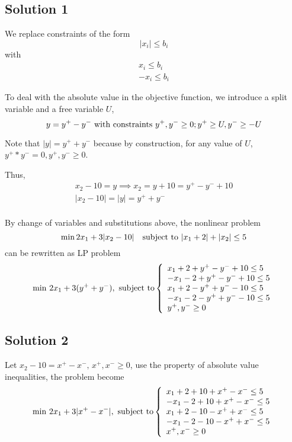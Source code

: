 \documentclass{article}
\begin{document}
\subsection{Solution 1}
We replace constraints of the form
\begin{equation} |x_i| \leq b_i \end{equation}
with
\begin{equation}
\begin{split}
	x_i \leq b_i \\
	-x_i \leq b_i
\end{split}
\end{equation}

To deal with the absolute value in the objective function, we introduce a split variable
and a free variable $U$,
\[ y = y^+ - y^- \textnormal{~with constraints~} y^+, y^- \geq 0; y^+ \geq U, y^- \geq -U \]

Note that $|y| = y^+ + y^-$ because by construction, for any value of $U$, $y^+ * y^- = 0,   y^+, y^- \geq 0$.

Thus,
\begin{gather}
x_2 - 10 = y \implies x_2 = y + 10 = y^+ - y^- + 10 \\
|x_2 - 10| = |y| = y^+ + y^- \\
\end{gather}

By change of variables and substitutions above, the nonlinear problem
\[ \min 2 x_1 + 3|x_2 - 10| \quad \textnormal{subject to~} |x_1 + 2| + |x_2| \leq 5 \]
can be rewritten as LP problem
\begin{equation}
\min \, 2x_1+3(y^+ + y^-), \textnormal{ subject to}
\left\{
    \begin{array}{l}
    x_1 + 2 + y^+ - y^- + 10 \leq 5 \\
    -x_1 - 2 + y^+ - y^- + 10 \leq 5 \\
    x_1 + 2 - y^+ + y^- - 10 \leq 5 \\
    -x_1 - 2 - y^+ + y^- - 10 \leq 5 \\
     y^+, y^- \geq 0
    \end{array}
\right.
\end{equation}

\subsection{Solution 2}
Let $x_2-10=x^+-x^-,\, x^+,x^-\geq 0$, use the property of absolute value inequalities, the problem become
\begin{equation}  
\min \, 2x_1+3|x^+-x^-|, \textnormal{ subject to}
\left\{  
             \begin{array}{ll}
             x_1+2+10+x^+-x^-\leq 5\\
             -x_1-2+10+x^+-x^-\leq 5\\
             x_1+2-10-x^++x^-\leq 5\\
             -x_1-2-10-x^++x^-\leq 5\\
             x^+,x^-\geq 0
             \end{array}  
\right.  
\end{equation}  
\end{document}
